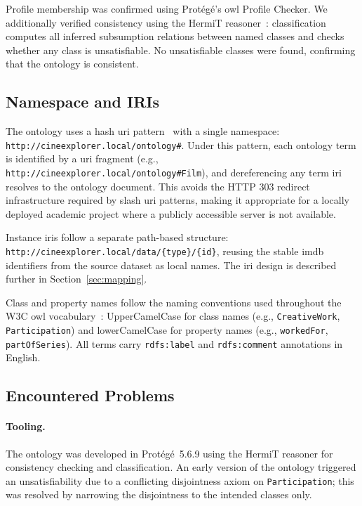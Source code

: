 Profile membership was confirmed using Protégé's \ac{owl} Profile Checker. We additionally verified consistency using the HermiT reasoner~\cite{hermit}: classification computes all inferred subsumption relations between named classes and checks whether any class is unsatisfiable. No unsatisfiable classes were found, confirming that the ontology is consistent.

\subsection{Namespace and IRIs}

The ontology uses a hash \ac{uri} pattern~\cite{cooluris} with a single namespace: \texttt{http://cineexplorer.local/ontology\#}. Under this pattern, each ontology term is identified by a \ac{uri} fragment (e.g., \texttt{http://cineexplorer.local/ontology\#Film}), and dereferencing any term \ac{iri} resolves to the ontology document. This avoids the HTTP 303 redirect infrastructure required by slash \ac{uri} patterns, making it appropriate for a locally deployed academic project where a publicly accessible server is not available.

\begin{sloppypar}
Instance \acp{iri} follow a separate path-based structure: \texttt{http://\allowbreak cineexplorer.local/\allowbreak data/\{type\}/\{id\}}, reusing the stable \ac{imdb} identifiers from the source dataset as local names. The \ac{iri} design is described further in Section~\ref{sec:mapping}.
\end{sloppypar}

Class and property names follow the naming conventions used throughout the W3C \ac{owl} vocabulary~\cite{owl2primer}: UpperCamelCase for class names (e.g., \texttt{CreativeWork}, \texttt{Participation}) and lowerCamelCase for property names (e.g., \texttt{workedFor}, \texttt{partOfSeries}). All terms carry \texttt{rdfs:label} and \texttt{rdfs:comment} annotations in English.

\subsection{Encountered Problems}

\paragraph{Tooling.}
The ontology was developed in Protégé~5.6.9 using the HermiT reasoner for consistency checking and classification. An early version of the ontology triggered an unsatisfiability due to a conflicting disjointness axiom on \texttt{Participation}; this was resolved by narrowing the disjointness to the intended classes only.

